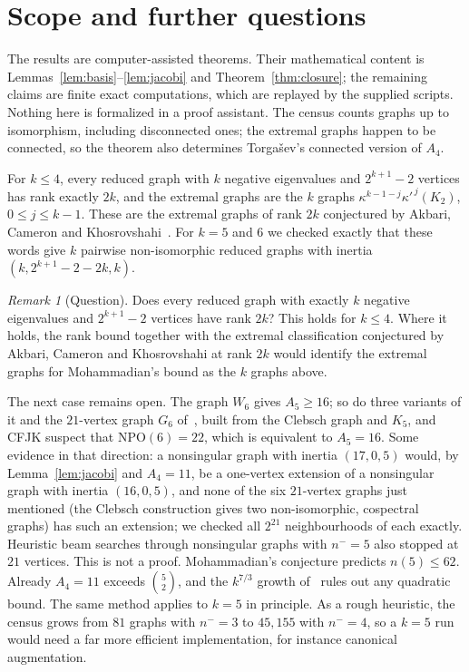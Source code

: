 \documentclass[11pt]{amsart}
\theoremstyle{definition}
\theoremstyle{remark}
\newtheorem{remark}[theorem]{Remark}
\begin{document}
\section{Scope and further questions}

The results are computer-assisted theorems. Their mathematical content is Lemmas~\ref{lem:basis}--\ref{lem:jacobi} and Theorem~\ref{thm:closure}; the remaining claims are finite exact computations, which are replayed by the supplied scripts. Nothing here is formalized in a proof assistant. The census counts graphs up to isomorphism, including disconnected ones; the extremal graphs happen to be connected, so the theorem also determines Torga\v{s}ev's connected version of $A_4$.

For $k\le4$, every reduced graph with $k$ negative eigenvalues and $2^{k+1}-2$ vertices has rank exactly $2k$, and the extremal graphs are the $k$ graphs $\kappa^{k-1-j}\kappa'^{\,j}(K_2)$, $0\le j\le k-1$. These are the extremal graphs of rank $2k$ conjectured by Akbari, Cameron and Khosrovshahi~\cite{ACK2004}. For $k=5$ and $6$ we checked exactly that these words give $k$ pairwise non-isomorphic reduced graphs with inertia $(k,2^{k+1}-2-2k,k)$.

\begin{remark}[Question]
Does every reduced graph with exactly $k$ negative eigenvalues and $2^{k+1}-2$ vertices have rank $2k$? This holds for $k\le4$. Where it holds, the rank bound together with the extremal classification conjectured by Akbari, Cameron and Khosrovshahi at rank $2k$ would identify the extremal graphs for Mohammadian's bound as the $k$ graphs above.
\end{remark}

The next case remains open. The graph $W_6$ gives $A_5\ge16$; so do three variants of it and the $21$-vertex graph $G_6$ of~\cite{CFJK2013}, built from the Clebsch graph and $K_5$, and CFJK suspect that $\mathrm{NPO}(6)=22$, which is equivalent to $A_5=16$. Some evidence in that direction: a nonsingular graph with inertia $(17,0,5)$ would, by Lemma~\ref{lem:jacobi} and $A_4=11$, be a one-vertex extension of a nonsingular graph with inertia $(16,0,5)$, and none of the six $21$-vertex graphs just mentioned (the Clebsch construction gives two non-isomorphic, cospectral graphs) has such an extension; we checked all $2^{21}$ neighbourhoods of each exactly. Heuristic beam searches through nonsingular graphs with $n^-=5$ also stopped at $21$ vertices. This is not a proof. Mohammadian's conjecture predicts $n(5)\le62$. Already $A_4=11$ exceeds $\binom{5}{2}$, and the $k^{7/3}$ growth of~\cite{EKPS2026} rules out any quadratic bound. The same method applies to $k=5$ in principle. As a rough heuristic, the census grows from $81$ graphs with $n^-=3$ to $45{,}155$ with $n^-=4$, so a $k=5$ run would need a far more efficient implementation, for instance canonical augmentation.
\end{document}
